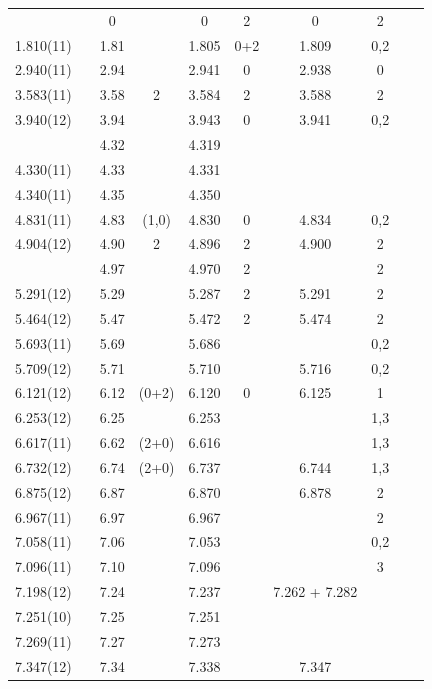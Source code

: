 {\begin{landscape}
\begin{center}
\begin{longtable}{cc cc cc cc cc}
\endlastfoot


	&		&	0	&		&	0	&	2	&	0	&	2	&		&		\\
1.810(11) 	&		&	1.81	&		&	1.805	&	0+2	&	1.809	&	0,2	&		&		\\
2.940(11) 	&		&	2.94	&		&	2.941	&	0	&	2.938	&	0	&		&		\\
3.583(11) 	&		&	3.58	&	2	&	3.584	&	2	&	3.588	&	2	&		&		\\
3.940(12) 	&		&	3.94	&		&	3.943	&	0	&	3.941	&	0,2	&		&		\\
	&		&	4.32	&		&	4.319	&		&		&		&		&		\\
4.330(11) 	&		&	4.33	&		&	4.331	&		&		&		&		&		\\
4.340(11) 	&		&	4.35	&		&	4.350	&		&		&		&		&		\\
4.831(11) 	&		&	4.83	&	(1,0)	&	4.830	&	0	&	4.834	&	0,2	&		&		\\
4.904(12) 	&		&	4.90	&	2	&	4.896	&	2	&	4.900	&	2	&		&		\\
	&		&	4.97	&		&	4.970	&	2	&		&	2	&		&		\\
5.291(12) 	&		&	5.29	&		&	5.287	&	2	&	5.291	&	2	&		&		\\
5.464(12) 	&		&	5.47	&		&	5.472	&	2	&	5.474	&	2	&		&		\\
5.693(11) 	&		&	5.69	&		&	5.686	&		&		&	0,2	&		&		\\
5.709(12) 	&		&	5.71	&		&	5.710	&		&	5.716	&	0,2	&		&		\\
6.121(12) 	&		&	6.12	&	(0+2)	&	6.120	&	0	&	6.125	&	1	&		&		\\
6.253(12) 	&		&	6.25	&		&	6.253	&		&		&	1,3	&		&		\\
6.617(11) 	&		&	6.62	&	(2+0)	&	6.616	&		&		&	1,3	&		&		\\
6.732(12) 	&		&	6.74	&	(2+0)	&	6.737	&		&	6.744	&	1,3	&		&		\\
6.875(12) 	&		&	6.87	&		&	6.870	&		&	6.878	&	2	&		&		\\
6.967(11) 	&		&	6.97	&		&	6.967	&		&		&	2	&		&		\\
7.058(11) 	&		&	7.06	&		&	7.053	&		&		&	0,2	&		&		\\
7.096(11) 	&		&	7.10	&		&	7.096	&		&		&	3	&		&		\\
7.198(12) 	&		&	7.24	&		&	7.237	&		&	7.262 + 7.282	&		&		&		\\
7.251(10) 	&		&	7.25	&		&	7.251	&		&		&		&		&		\\
7.269(11) 	&		&	7.27	&		&	7.273	&		&		&		&		&		\\
7.347(12) 	&		&	7.34	&		&	7.338	&		&	7.347	&		&		&		\\

\end{longtable}
\end{center}
\end{landscape}}
